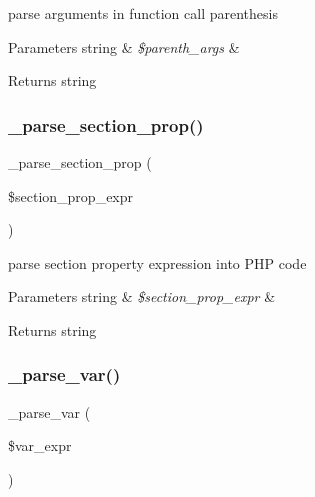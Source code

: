 parse arguments in function call parenthesis


\begin{DoxyParams}[1]{Parameters}
string & {\em \$parenth\+\_\+args} & \\
\hline
\end{DoxyParams}
\begin{DoxyReturn}{Returns}
string 
\end{DoxyReturn}
\mbox{\label{class_smarty___compiler_a4509a57efd495c63579f7447c2d28972}} 
\subsubsection{\texorpdfstring{\+\_\+parse\+\_\+section\+\_\+prop()}{\_parse\_section\_prop()}}
{\footnotesize\ttfamily \+\_\+parse\+\_\+section\+\_\+prop (\begin{DoxyParamCaption}\item[{}]{\$section\+\_\+prop\+\_\+expr }\end{DoxyParamCaption})}

parse section property expression into P\+HP code


\begin{DoxyParams}[1]{Parameters}
string & {\em \$section\+\_\+prop\+\_\+expr} & \\
\hline
\end{DoxyParams}
\begin{DoxyReturn}{Returns}
string 
\end{DoxyReturn}
\mbox{\label{class_smarty___compiler_aeeaa2b6e8325e1aa932d45a189e8bce6}} 
\subsubsection{\texorpdfstring{\+\_\+parse\+\_\+var()}{\_parse\_var()}}
{\footnotesize\ttfamily \+\_\+parse\+\_\+var (\begin{DoxyParamCaption}\item[{}]{\$var\+\_\+expr }\end{DoxyParamCaption})}

